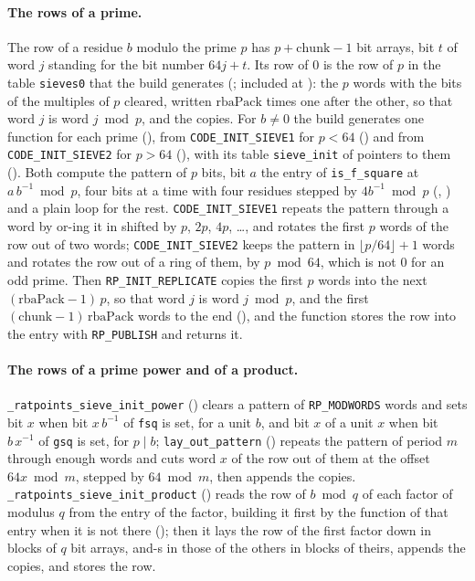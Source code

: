 \paragraph{The rows of a prime.} The row of a residue $b$ modulo the prime $p$ has $p +
\mathrm{chunk} - 1$ bit arrays, bit $t$ of word $j$ standing for the bit number $64 j + t$. Its row
of $0$ is the row of $p$ in the table \verb|sieves0| that the build generates
(; included at ): the $p$
words with the bits of the multiples of $p$ cleared, written $\mathrm{rbaPack}$ times one after the
other, so that word $j$ is word $j \bmod p$, and the copies. For $b \ne 0$ the build generates one
function for each prime (), from \verb|CODE_INIT_SIEVE1| for $p
< 64$ () and from \verb|CODE_INIT_SIEVE2| for $p > 64$
(), with its table \verb|sieve_init| of pointers to them
(). Both compute the pattern of $p$ bits, bit $a$ the entry of
\verb|is_f_square| at $a\, b^{-1} \bmod p$, four bits at a time with four residues stepped by $4
b^{-1} \bmod p$ (, ) and a plain loop for the rest.
\verb|CODE_INIT_SIEVE1| repeats the pattern through a word by or-ing it in shifted by $p$, $2p$,
$4p$, \dots, and rotates the first $p$ words of the row out of two words; \verb|CODE_INIT_SIEVE2|
keeps the pattern in $\lfloor p/64 \rfloor + 1$ words and rotates the row out of a ring of them, by
$p \bmod 64$, which is not $0$ for an odd prime. Then \verb|RP_INIT_REPLICATE| copies the first $p$
words into the next $(\mathrm{rbaPack} - 1)\, p$, so that word $j$ is word $j \bmod p$, and the
first $(\mathrm{chunk} - 1)\,\mathrm{rbaPack}$ words to the end (), and the
function stores the row into the entry with \verb|RP_PUBLISH| and returns it.

\paragraph{The rows of a prime power and of a product.} \verb|_ratpoints_sieve_init_power|
() clears a pattern of \verb|RP_MODWORDS| words and sets bit $x$ when bit
$x\, b^{-1}$ of \verb|fsq| is set, for a unit $b$, and bit $x$ of a unit $x$ when bit $b\, x^{-1}$
of \verb|gsq| is set, for $p \mid b$; \verb|lay_out_pattern| () repeats
the pattern of period $m$ through enough words and cuts word $x$ of the row out of them at the
offset $64 x \bmod m$, stepped by $64 \bmod m$, then appends the copies.
\verb|_ratpoints_sieve_init_product| () reads the row of $b \bmod q$ of
each factor of modulus $q$ from the entry of the factor, building it first by the function of that
entry when it is not there (); then it lays the row of the first factor
down in blocks of $q$ bit arrays, and-s in those of the others in blocks of theirs, appends the
copies, and stores the row.

